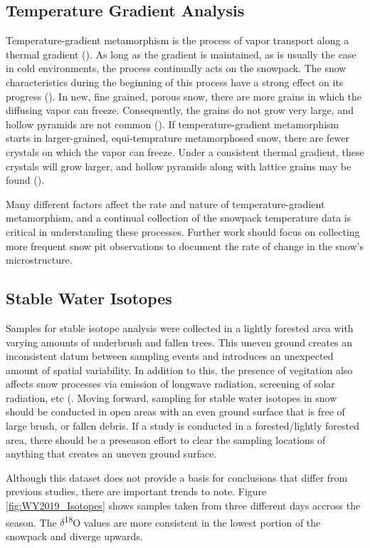 \subsection{Temperature Gradient Analysis}
Temperature-gradient metamorphism is the process of vapor transport along a thermal gradient (\cite{sommerfeld_1970}). As long as the gradient is maintained, as is usually the case in cold environments, the process continually acts on the snowpack. The snow characteristics during the beginning of this process have a strong effect on its progress (\cite{sommerfeld_1970}). In new, fine grained, porous snow, there are more grains in which the diffusing vapor can freeze. Consequently, the grains do not grow very large, and hollow pyramids are not common (\cite{sommerfeld_1970}). If temperature-gradient metamorphism starts in larger-grained, equi-temprature metamorphosed snow, there are fewer crystals on which the vapor can freeze. Under a consistent thermal gradient, these crystals will grow larger, and hollow pyramids along with lattice grains may be found (\cite{akitaya_1967}). 

Many different factors affect the rate and nature of temperature-gradient metamorphism, and a continual collection of the snowpack temperature data is critical in understanding these processes. Further work should focus on collecting more frequent snow pit observations to document the rate of change in the snow's microstructure. 

\subsection{Stable Water Isotopes}
 Samples for stable isotope analysis were collected in a lightly forested area with varying amounts of underbrush and fallen trees. This uneven ground creates an inconsistent datum between sampling events and introduces an unexpected amount of spatial variability. In addition to this, the presence of vegitation also affects snow processes via emission of longwave radiation, screening of solar radiation, etc (\cite{beria_larsen_ceperley_michelon_vennemann_schaefli_2017}. Moving forward, sampling for stable water isotopes in snow should be conducted in open areas with an even ground surface that is free of large brush, or fallen debris. If a study is conducted in a forested/lightly forested area, there should be a preseason effort to clear the sampling locations of anything that creates an uneven ground surface. 

Although this dataset does not provide a basis for conclusions that differ from previous studies, there are important trends to note. Figure \ref{fig:WY2019_Isotopes} shows samples taken from three different days accross the season. The $\delta$\textsuperscript{18}O values are more consistent in the lowest portion of the snowpack and diverge upwards. 

